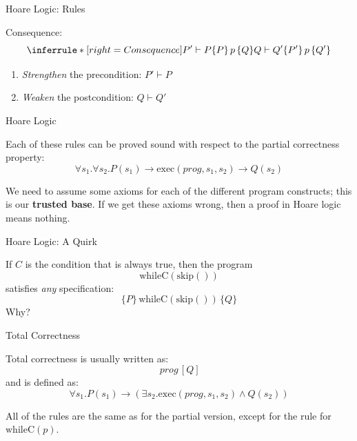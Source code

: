 \documentclass[xetex,aspectratio=169,14pt,hyperref={pdfpagelabels=true,pdflang={en-GB}}]{beamer}
\begin{document}
\begin{frame}
  {Hoare Logic: Rules}

  Consequence:
  \begin{displaymath}
    \inferrule* [right=Consequence]
    {P' \vdash P \\ \{ P \}\,p\,\{ Q \} \\ Q \vdash Q'}
    {\{ P' \}\,p\,\{ Q' \}}
  \end{displaymath}

  \bigskip
  \begin{enumerate}
  \item \emph{Strengthen} the precondition: $P' \vdash P$
  \item \emph{Weaken} the postcondition: $Q \vdash Q'$
  \end{enumerate}
\end{frame}

\begin{frame}
  {Hoare Logic}

  Each of these rules can be proved sound with respect to the partial
  correctness property:
  \begin{displaymath}
    \forall s_1. \forall s_2. P(s_1) \to \mathrm{exec}(\mathit{prog},s_1,s_2) \to Q(s_2)
  \end{displaymath}

  \bigskip

  We need to assume some axioms for each of the different program
  constructs; this is our {\bf trusted base}. If we get these axioms
  wrong, then a proof in Hoare logic means nothing.

\end{frame}

\begin{frame}
  {Hoare Logic: A Quirk}

  If $C$ is the condition that is always true, then the program
  \begin{displaymath}
    \mathrm{whileC}(\mathrm{skip}())
  \end{displaymath}
  satisfies \emph{any} specification:
  \begin{displaymath}
    \{ P \}\,\mathrm{whileC}(\mathrm{skip}())\,\{ Q \}
  \end{displaymath}
  Why?
\end{frame}

\begin{frame}
  {Total Correctness}

  Total correctness is usually written as:
  \begin{displaymath}
    [ P ]\,\mathit{prog}\,[ Q ]
  \end{displaymath}
  and is defined as:
  \begin{displaymath}
    \forall s_1. P(s_1) \to (\exists s_2. \mathrm{exec}(\mathit{prog},s_1,s_2) \land Q(s_2))
  \end{displaymath}

  \bigskip

  All of the rules are the same as for the partial version, except for
  the rule for $\mathrm{whileC}(p)$.
\end{frame}
\end{document}
